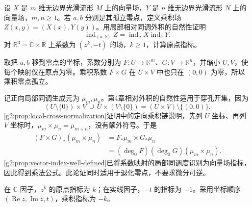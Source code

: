 \begin{exercise}\label{g2:ex:product-vector-field-index}
	设 \(X\) 是 \(m\) 维无边界光滑流形 \(M\) 上的向量场，\(Y\) 是 \(n\) 维无边界光滑流形 \(N\) 上的向量场，\(m,n\ge1\)。若 \(a,b\) 分别是其孤立零点，定义乘积场 \(Z(x,y)=(X(x),Y(y))\)。用局部相对同调外积的自然性证明
	\[
		\operatorname{ind}_{(a,b)}Z=\operatorname{ind}_aX\operatorname{ind}_bY.
	\]
	对 \(\mathbb R^3=\mathbb C\times\mathbb R\) 上系数为 \((z^k,-t)\) 的场，\(k\ge1\)，计算原点指标。
\end{exercise}
\begin{solution}
	取把 \(a,b\) 移到零点的坐标，系数分别为 \(F:U\to\mathbb R^m\)、\(G:V\to\mathbb R^n\)，并缩小 \(U,V\)，使每个映射仅在原点为零。乘积系数 \(F\times G\) 在 \(U\times V\) 中也只在 \((0,0)\) 为零，所以乘积零点孤立。

	记正向局部同调生成元为 \(\mu_m,\mu_n\)。第4章相对外积的自然性适用于穿孔开集，因为
	\[
		(U\setminus\{0\})\times V\ \cup\ U\times(V\setminus\{0\})
		=(U\times V)\setminus\{(0,0)\}.
	\]
	\cref{g2:prop:local-cross-normalization}证明中的定向乘积链说明，先列 \(U\) 坐标、再列 \(V\) 坐标时，\(\mu_m\times\mu_n=\mu_{m+n}\)，没有额外符号。于是
	\begin{align*}
		(F\times G)_*(\mu_m\times\mu_n)
		&=F_*\mu_m\times G_*\mu_n\\
		&=(\deg_0F)(\deg_0G)(\mu_m\times\mu_n).
	\end{align*}
	\cref{g2:prop:vector-index-well-defined}已将系数映射的局部同调度识别为向量场指标，因此得到乘法公式。此论证同时适用于退化零点，不要求微分可逆。

	在 \(\mathbb C\) 因子，\(z^k\) 的原点指标为 \(k\)；在实线因子，\(-t\) 的指标为 \(-1\)。采用坐标顺序 \((\operatorname{Re}z,\operatorname{Im}z,t)\)，乘积指标为 \(-k\)。
\end{solution}

